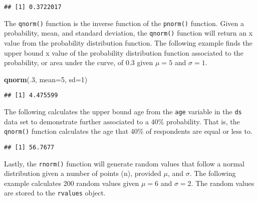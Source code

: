 \documentclass[]{article}
\newenvironment{Shaded}{\begin{snugshade}}{\end{snugshade}}
\newcommand{\KeywordTok}[1]{\textcolor[rgb]{0.13,0.29,0.53}{\textbf{#1}}}
\newcommand{\DataTypeTok}[1]{\textcolor[rgb]{0.13,0.29,0.53}{#1}}
\newcommand{\DecValTok}[1]{\textcolor[rgb]{0.00,0.00,0.81}{#1}}
\newcommand{\OperatorTok}[1]{\textcolor[rgb]{0.81,0.36,0.00}{\textbf{#1}}}
\newcommand{\NormalTok}[1]{#1}
\begin{document}
\begin{verbatim}
## [1] 0.3722017
\end{verbatim}

The \texttt{qnorm()} function is the inverse function of the
\texttt{pnorm()} function. Given a probability, mean, and standard
deviation, the \texttt{qnorm()} function will return an x value from the
probability distribution function. The following example finds the upper
bound x value of the probability distribution function associated to the
probability, or area under the curve, of 0.3 given \(\mu = 5\) and
\(\sigma = 1\).

\begin{Shaded}
\begin{Highlighting}[]
\KeywordTok{qnorm}\NormalTok{(.}\DecValTok{3}\NormalTok{, }\DataTypeTok{mean=}\DecValTok{5}\NormalTok{, }\DataTypeTok{sd=}\DecValTok{1}\NormalTok{)}
\end{Highlighting}
\end{Shaded}

\begin{verbatim}
## [1] 4.475599
\end{verbatim}

The following calculates the upper bound age from the \texttt{age}
variable in the \texttt{ds} data set to demonstrate further associated
to a 40\% probability. That is, the \texttt{qnorm()} function calculates
the age that 40\% of respondents are equal or less to.

\begin{Shaded}
\end{Shaded}

\begin{verbatim}
## [1] 56.7677
\end{verbatim}

Lastly, the \texttt{rnorm()} function will generate random values that
follow a normal distribution given a number of points (n), provided
\(\mu\), and \(\sigma\). The following example calculates 200 random
values given \(\mu = 6\) and \(\sigma = 2\). The random values are
stored to the \texttt{rvalues} object.
\end{document}
